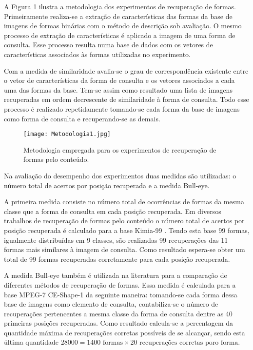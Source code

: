 A  Figura \ref{fig:metodo_cbir} ilustra a metodologia dos experimentos de recuperação de formas.  Primeiramente realiza-se a extração de características das formas da base de imagens de formas binárias com o método de descrição sob avaliação. O mesmo processo de extração de características é aplicado a imagem de uma forma de consulta. Esse processo resulta numa base de dados com os vetores de características associados às formas utilizadas no experimento. 

Com a medida de similaridade avalia-se o grau de correspondência existente entre o vetor de características da forma de consulta e os vetores associados a cada uma das formas da base. Tem-se assim como resultado uma lista de imagens recuperadas em ordem decrescente de similaridade à forma de consulta. Todo esse processo é realizado repetidamente tomando-se cada forma da base de imagens como forma de consulta e recuperando-se as demais.

\begin{figure}[h!]
  \caption{\label{fig:metodo_cbir} Metodologia empregada para os experimentos de recuperação de formas pelo conteúdo.}
  \centering
  \texttt{[image: Metodologia1.jpg]}
\end{figure}

Na avaliação do desempenho dos experimentos duas medidas são utilizadas: o número total de acertos por posição recuperada e a medida Bull-eye.

A primeira medida consiste no número total de ocorrências de formas da mesma classe que a forma de consulta em cada posição recuperada.  Em diversos trabalhos de recuperação de formas pelo conteúdo o número total de acertos por posição recuperada é calculado para a base Kimia-99 \cite{Bernier:2003}. Tendo esta base 99 formas, igualmente distribuídas em 9 classes, são realizadas 99 recuperações das 11 formas mais similares à imagem de consulta. Como resultado espera-se obter um total de 99 formas recuperadas corretamente para cada posição recuperada.

A medida Bull-eye também é utilizada na literatura para a comparação de diferentes métodos de recuperação de formas. Essa medida é calculada para a base MPEG-7 CE-Shape-1 da seguinte maneira: tomando-se cada forma dessa base de imagens como elemento de consulta, contabiliza-se o número de recuperações pertencentes a mesma classe da forma de consulta dentre as 40 primeiras posições recuperadas. Como resultado calcula-se a percentagem da quantidade máxima de recuperações corretas possíveis de se alcançar, sendo esta última quantidade $28000 = 1400\text{ formas} \times 20\text{ recuperações corretas poro forma}$. 
 

